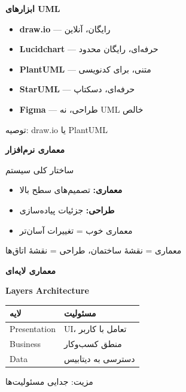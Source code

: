 \documentclass[14pt, a4paper, landscape]{extarticle}
\newcommand{\slide}[1]{%
    \newpage
    \begin{center}
    \begin{minipage}[t]{0.95\textwidth}
    \vspace{0.5cm}
    #1
    \vspace{0.5cm}
    \end{minipage}
    \end{center}
}
\newcommand{\slidetitle}[1]{%
    \begin{center}
        {\LARGE\bfseries\textcolor{primary}{#1}}
    \end{center}
    \vspace{0.5cm}
}
\newcommand{\myaccent}[1]{\textcolor{accent}{#1}}
\begin{document}
\slide{
    \slidetitle{ابزارهای UML}
    \vspace{0.5cm}
    \begin{itemize}[itemsep=0.6em]
        \item \textbf{draw.io} — رایگان، آنلاین
        \item \textbf{Lucidchart} — حرفه‌ای، رایگان محدود
        \item \textbf{PlantUML} — متنی، برای کدنویسی
        \item \textbf{StarUML} — حرفه‌ای، دسکتاپ
        \item \textbf{Figma} — طراحی، نه UML خالص
    \end{itemize}
    \vspace{0.5cm}
    \begin{center}
        {\myaccent{توصیه: draw.io یا PlantUML}}
    \end{center}
}

\slide{
    \slidetitle{معماری نرم‌افزار}
    \vspace{0.5cm}
    {\large ساختار کلی سیستم}
    \vspace{0.8cm}
    \begin{itemize}[itemsep=0.5em]
        \item \textbf{معماری:} تصمیم‌های سطح بالا
        \item \textbf{طراحی:} جزئیات پیاده‌سازی
        \item معماری خوب = تغییرات آسان‌تر
    \end{itemize}
    \vspace{0.5cm}
    \begin{center}
        {\large\myaccent{معماری = نقشهٔ ساختمان، طراحی = نقشهٔ اتاق‌ها}}
    \end{center}
}

\slide{
    \slidetitle{معماری لایه‌ای}
    \vspace{0.5cm}
    \begin{center}
        {\large\bfseries Layers Architecture}
    \end{center}
    \vspace{0.5cm}
    \begin{center}
        \begin{tabular}{ll}
            \toprule
            \textbf{لایه} & \textbf{مسئولیت} \\
            \midrule
            Presentation & UI، تعامل با کاربر \\
            \hline
            Business & منطق کسب‌وکار \\
            \hline
            Data & دسترسی به دیتابیس \\
            \bottomrule
        \end{tabular}
    \end{center}
    \vspace{0.5cm}
    \begin{center}
        {\myaccent{مزیت: جدایی مسئولیت‌ها}}
    \end{center}
}
\end{document}
